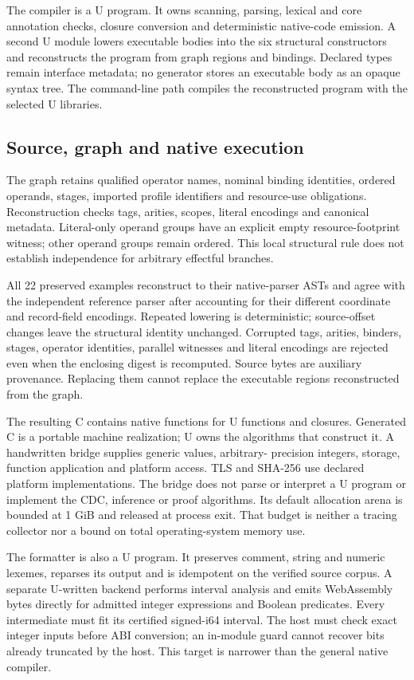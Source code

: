 \documentclass[11pt]{article}
\theoremstyle{remark}
\begin{document}
The compiler is a U program. It owns scanning, parsing, lexical and core
annotation checks, closure conversion and deterministic native-code
emission. A second U module lowers executable bodies into the six structural
constructors and reconstructs the program from graph regions and bindings.
Declared types remain interface metadata; no generator stores an executable
body as an opaque syntax tree. The command-line path compiles the reconstructed
program with the selected U libraries.

\subsection{Source, graph and native execution}

The graph retains qualified operator names, nominal binding identities,
ordered operands, stages, imported profile identifiers and resource-use
obligations. Reconstruction checks tags, arities, scopes, literal encodings
and canonical metadata. Literal-only operand groups have an explicit empty
resource-footprint witness; other operand groups remain ordered. This local
structural rule does not establish independence for arbitrary effectful
branches.

All 22 preserved examples reconstruct to their native-parser ASTs and agree
with the independent reference parser after accounting for their different
coordinate and record-field encodings. Repeated lowering is deterministic;
source-offset changes leave the structural identity unchanged. Corrupted
tags, arities, binders, stages, operator identities, parallel witnesses and
literal encodings are rejected even when the enclosing digest is recomputed.
Source bytes are auxiliary provenance. Replacing them cannot replace the
executable regions reconstructed from the graph.

The resulting C contains native functions for U functions and closures.
Generated C is a portable machine realization; U owns the algorithms that
construct it. A handwritten bridge supplies generic values, arbitrary-
precision integers, storage, function application and platform access. TLS
and SHA-256 use declared platform implementations. The bridge does not parse
or interpret a U program or implement the CDC, inference or proof algorithms.
Its default allocation arena is bounded at 1 GiB and released at process
exit. That budget is neither a tracing collector nor a bound on total
operating-system memory use.

The formatter is also a U program. It preserves comment, string and numeric
lexemes, reparses its output and is idempotent on the verified source corpus.
A separate U-written backend performs interval analysis and emits WebAssembly
bytes directly for admitted integer expressions and Boolean predicates.
Every intermediate must fit its certified signed-i64 interval. The host must
check exact integer inputs before ABI conversion; an in-module guard cannot
recover bits already truncated by the host. This target is narrower than
the general native compiler.
\end{document}

